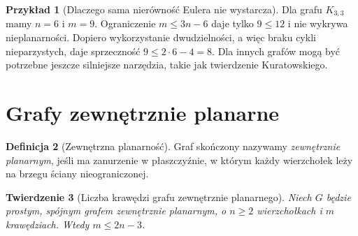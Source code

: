 \documentclass[11pt,a4paper]{report}
\numberwithin{equation}{section}
\theoremstyle{plain}
\newtheorem{twierdzenie}{Twierdzenie}[section]
\theoremstyle{definition}
\newtheorem{definicja}[twierdzenie]{Definicja}
\newtheorem{przyklad}[twierdzenie]{Przykład}
\theoremstyle{remark}
\begin{document}
\begin{przyklad}[Dlaczego sama nierówność Eulera nie wystarcza]
Dla grafu $K_{3,3}$ mamy $n=6$ i $m=9$.
Ograniczenie $m\le3n-6$ daje tylko $9\le12$ i nie wykrywa
nieplanarności. Dopiero wykorzystanie dwudzielności,
a więc braku cykli nieparzystych, daje sprzeczność
$9\le2\cdot6-4=8$. Dla innych grafów mogą być potrzebne
jeszcze silniejsze narzędzia, takie jak twierdzenie Kuratowskiego.
\end{przyklad}

\section{Grafy zewnętrznie planarne}
\label{sec:tg-outerplanar}

\begin{definicja}[Zewnętrzna planarność]
Graf skończony nazywamy \emph{zewnętrznie planarnym}, jeśli
ma zanurzenie w płaszczyźnie, w którym każdy wierzchołek
leży na brzegu ściany nieograniczonej.
\end{definicja}

\begin{twierdzenie}[Liczba krawędzi grafu zewnętrznie planarnego]
Niech $G$ będzie prostym, spójnym grafem zewnętrznie planarnym,
o $n\ge2$ wierzchołkach i $m$ krawędziach. Wtedy
$m\le2n-3$.
\end{twierdzenie}
\end{document}
